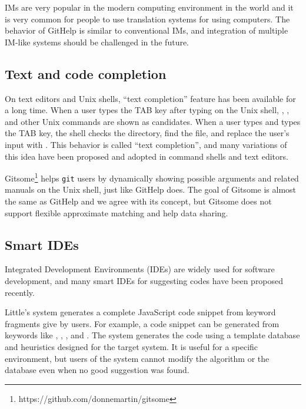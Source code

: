 \documentclass[manuscript,screen,review]{acmart}
\def\GH{\textsf{GitHelp}}
\def\GIT{\texttt{git}}
\begin{document}
IMs are very popular in the modern computing environment in the world
and it is very common for people to 
use translation systems for using computers.
%
The behavior of {\GH} is similar to conventional IMs, and
integration of multiple IM-like systems should be challenged in the future.

\subsection{Text and code completion}

On text editors and Unix shells,
``text completion'' feature has been available for a long time.
%
When a user types the TAB key after typing  on the Unix shell,
, , and other Unix commands are shown as candidates.
When a user types  and types the TAB key,
the shell checks the directory, find the  file, and
replace the user's input with .
This behavior is called ``text completion'', and many variations of
this idea have been proposed and adopted in command shells and text editors.


Gitsome\footnote{\textsf{https:{\slash}{\slash}github.com{\slash}donnemartin{\slash}gitsome}}
helps {\GIT} users by
dynamically showing possible arguments and related manuals on the Unix shell,
just like {\GH} does.
The goal of Gitsome is almost the same as {\GH} and we agree with its concept,
but Gitsome does not support flexible approximate matching and
help data sharing.

\subsection{Smart IDEs}

Integrated Development Environments (IDEs) are widely used for
software development, and
many smart IDEs for suggesting codes have been proposed recently.

Little's system\cite{Little:2006:TKC:1166253.1166275}
generates a complete JavaScript code snippet from keyword fragments
give by users.
For example, a code snippet
can be generated from keywords like
,
,
,
and .
The system generates the code using a template database and heuristics
designed for the target system.
It is useful for a specific environment, but
users of the system cannot modify the algorithm or the database
even when no good suggestion was found.
\end{document}
